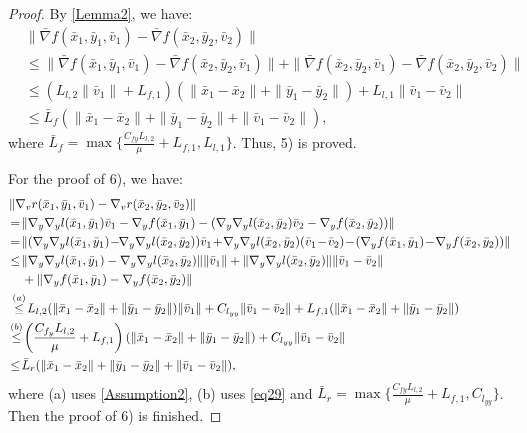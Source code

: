 \documentclass{article}
\theoremstyle{plain}
\theoremstyle{definition}
\theoremstyle{remark}
\begin{document}
\begin{proof}
By \cref{Lemma2}, we have:
\begin{align}
&\|\bar{\nabla} f(\bar{x}_1, \bar{y}_1, \bar{v}_1) - \bar{\nabla} f(\bar{x}_2, \bar{y}_2, \bar{v}_2)\| \nonumber\\
&\leq \|\bar{\nabla} f(\bar{x}_1, \bar{y}_1, \bar{v}_1) - \bar{\nabla} f(\bar{x}_2, \bar{y}_2, \bar{v}_1)\| + \|\bar{\nabla} f(\bar{x}_2, \bar{y}_2, \bar{v}_1) - \bar{\nabla} f(\bar{x}_2, \bar{y}_2, \bar{v}_2)\| \nonumber \\
&\leq (L_{l,2} \|\bar{v}_1\| + L_{f,1})(\|\bar{x}_1 - \bar{x}_2\| + \|\bar{y}_1 - \bar{y}_2\|) + L_{l,1} \|\bar{v}_1 - \bar{v}_2\|\nonumber\\
&\leq\bar{L}_f(\|\bar{x}_1 - \bar{x}_2\| + \|\bar{y}_1 - \bar{y}_2\|+\|\bar{v}_1 - \bar{v}_2\|),\label{eqlf}
\end{align}
where $\bar{L}_f=\max\{\frac{C_{fy}L_{l,2}}{\mu} + L_{f,1}, L_{l,1}\}$. Thus, 5) is proved.

For the proof of 6), we have:
\begin{align}
    &\|\nabla_v r(\bar{x}_1, \bar{y}_1, \bar{v}_1) - \nabla_v r(\bar{x}_2, \bar{y}_2, \bar{v}_2)\| \notag \\
    &\!= \!\|\nabla_y\nabla_y l(\bar{x}_1, \bar{y}_1)\bar{v}_1 - \nabla_y f(\bar{x}_1, \bar{y}_1) 
    - (\nabla_y\nabla_y l(\bar{x}_2, \bar{y}_2)\bar{v}_2 - \nabla_y f(\bar{x}_2, \bar{y}_2))\| \notag \\
    &\!= \!\|(\nabla_y\nabla_y l(\bar{x}_1, \bar{y}_1) \!-\!\! \nabla_y\nabla_y l(\bar{x}_2, \bar{y}_2))\bar{v}_1 
    \!+\! \nabla_y\nabla_y l(\bar{x}_2, \bar{y}_2)(\bar{v}_1 \!-\! \bar{v}_2) 
    \!-\! (\nabla_y f(\bar{x}_1, \bar{y}_1) \!-\! \nabla_y f(\bar{x}_2, \bar{y}_2))\|\notag\\
    &\!\leq \!\|\nabla_y\nabla_y l(\bar{x}_1, \bar{y}_1) - \nabla_y\nabla_y l(\bar{x}_2, \bar{y}_2)\|  \|\bar{v}_1\|  + \|\nabla_y\nabla_y l(\bar{x}_2, \bar{y}_2)\| \|\bar{v}_1 - \bar{v}_2\| \notag\\
    &\quad+ \|\nabla_y f(\bar{x}_1, \bar{y}_1) - \nabla_y f(\bar{x}_2, \bar{y}_2)\|\notag\\
     &\overset{(a)}{\leq}\! L_{l,2} (\|\bar{x}_1 - \bar{x}_2\| + \|\bar{y}_1 - \bar{y}_2\|) \|\bar{v}_1\| + C_{l_{yy}}  \|\bar{v}_1 - \bar{v}_2\| + L_{f,1} (\|\bar{x}_1 - \bar{x}_2\| + \|\bar{y}_1 - \bar{y}_2\|)\notag\\
     &\!\overset{(b)}{\leq}\! \left( \frac{C_{f_y}L_{l,2}}{\mu} + L_{f,1}\right) (\|\bar{x}_1 - \bar{x}_2\| + \|\bar{y}_1 - \bar{y}_2\|) + C_{l_{yy}} \|\bar{v}_1 - \bar{v}_2\|\notag\\
     &\!\leq\! \bar{L}_r(\|\bar{x}_1 - \bar{x}_2\| + \|\bar{y}_1 - \bar{y}_2\|+\|\bar{v}_1 - \bar{v}_2\|),\label{eqvnew}
\end{align}
where (a) uses \cref{Assumption2}, (b) uses \cref{eq29} and $\bar{L}_r=\max\{\frac{C_{fy}L_{l,2}}{\mu} + L_{f,1}, C_{l_{yy}}\}$. Then the proof of 6) is finished.



\end{proof}
\end{document}
